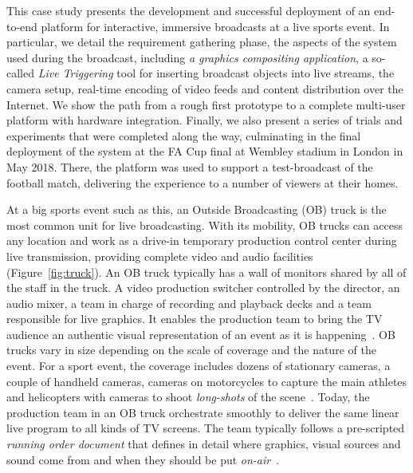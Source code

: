 \documentclass[sigchi-a]{acmart}
\begin{document}
This case study presents the development and successful deployment of an
end-to-end platform for interactive, immersive broadcasts at
a live sports event. In particular, we detail the requirement gathering phase,
the aspects of the system used during the broadcast, including \emph{a graphics compositing
application}, a so-called \emph{Live Triggering} tool for inserting broadcast objects
into live streams, the camera setup, real-time encoding of video feeds and content
distribution over the Internet.
We show the path from a rough first prototype to a complete multi-user platform
with hardware integration. Finally, we also present a series of trials and
experiments that were completed along the way, culminating in the final
deployment of the system at the FA Cup final at Wembley stadium in London in
May 2018. There, the platform was used to support a test-broadcast of the
football match, delivering the experience to a number of viewers at
their homes.

At a big sports event such as this, an Outside Broadcasting (OB) truck is the most
common unit for live broadcasting. With its mobility, OB trucks can access any
location and work as a drive-in temporary production control center during live
transmission, providing complete video and audio facilities (Figure~\ref{fig:truck}).
An OB truck typically has a wall of monitors shared by all of the staff in the truck.
A video production switcher controlled by the director, an audio mixer, a team in
charge of recording and playback decks and a team responsible for live graphics.
It enables the production team to bring the TV audience an authentic
visual representation of an event as it is happening~\cite{owens2015}.
OB trucks vary in size depending on the scale of coverage and the nature of the
event. For a sport event, the coverage includes dozens of stationary cameras, a
couple of handheld cameras, cameras on motorcycles to capture the main athletes
and helicopters with cameras to shoot \emph{long-shots} of the
scene~\cite{owens2015, Li:2018_TVX}. Today, the production team in an OB truck
orchestrate smoothly to deliver the same linear live program to all kinds of TV
screens. The team typically follows a pre-scripted \emph{running order document} that
defines in detail where graphics, visual sources and sound come from and when
they should be put \emph{on-air}~\cite{Li:2018_TVX}.
\end{document}
